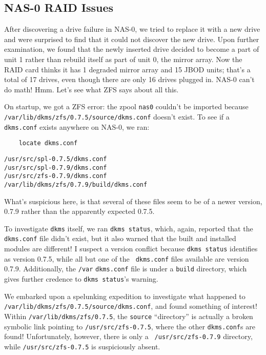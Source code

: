 \documentclass[12pt]{article}
\begin{document}

\subsection{NAS-0 RAID Issues}

\qq After discovering a drive failure in NAS-0, we tried to replace it with a
new drive and were surprised to find that it could not discover the new
drive. Upon further examination, we found that the newly inserted drive decided
to become a part of unit 1 rather than rebuild itself as part of unit 0, the
mirror array. Now the RAID card thinks it has 1 degraded mirror array and 15
JBOD units; that's a total of 17 drives, even though there are only 16 drives
plugged in. NAS-0 can't do math! Hmm. Let's see what ZFS says about all this.

\qq On startup, we got a ZFS error: the zpool {\tt nas0} couldn't be imported
because \\ {\tt /var/lib/dkms/zfs/0.7.5/source/dkms.conf} doesn't exist. To see if
a {\tt dkms.conf} exists anywhere on NAS-0, we ran: 

\begin{tcolorbox}[colback=white, colframe=black]
  \begin{verbatim}
    locate dkms.conf
  \end{verbatim}
  \tcblower
  {\tt /usr/src/spl-0.7.5/dkms.conf} \\
  {\tt /usr/src/spl-0.7.9/dkms.conf} \\
  {\tt /usr/src/zfs-0.7.9/dkms.conf} \\
  {\tt /var/lib/dkms/zfs/0.7.9/build/dkms.conf} \\ 
\end{tcolorbox}

What's suspicious here, is that several of these files seem to be of a newer
version, 0.7.9 rather than the apparently expected 0.7.5.

\qq To investigate {\tt dkms} itself, we ran {\tt dkms status}, which, again,
reported that the {\tt dkms.conf} file didn't exist, but it also warned that the
built and installed modules are different! I suspect a version conflict because
{\tt dkms status} identifies as version 0.7.5, while all but one of the {\tt
  dkms.conf} files available are version 0.7.9. Additionally, the {\tt /var}
{\tt dkms.conf} file is under a {\tt build} directory, which gives further
credence to {\tt dkms status}'s warning. 

\qq We embarked upon a spelunking expedition to investigate what happened to\\
{\tt /var/lib/dkms/zfs/0.7.5/source/dkms.conf}, and found something of
interest!\\
Within {\tt /var/lib/dkms/zfs/0.7.5}, the {\tt source} ``directory'' is actually
a broken symbolic link pointing to {\tt /usr/src/zfs-0.7.5}, where the other
{\tt dkms.conf}s are found! Unfortunately, however, there is only a {\tt
  /usr/src/zfs-0.7.9} directory, while {\tt /usr/src/zfs-0.7.5} is suspiciously
absent.
\end{document}
